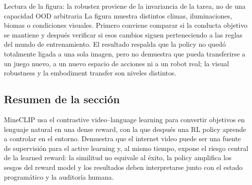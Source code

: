 
\begin{knowledgebox}{Lectura de la figura: la robustez proviene de la invariancia de la tarea, no de una capacidad OOD arbitraria}
La figura muestra distintos climas, iluminaciones, biomas o condiciones visuales. Primero conviene comparar si la conducta objetivo se mantiene y después verificar si esos cambios siguen perteneciendo a las reglas del mundo de entrenamiento. El resultado respalda que la policy no quedó totalmente ligada a una sola imagen, pero no demuestra que pueda transferirse a un juego nuevo, a un nuevo espacio de acciones ni a un robot real; la visual robustness y la embodiment transfer son niveles distintos.
\end{knowledgebox}


\subsection{Resumen de la sección}

MineCLIP usa el contrastive video--language learning para convertir objetivos en lenguaje natural en una dense reward, con la que después una RL policy aprende a controlar en el entorno. Demuestra que el internet video puede ser una fuente de supervisión para el active learning y, al mismo tiempo, expone el riesgo central de la learned reward: la similitud no equivale al éxito, la policy amplifica los sesgos del reward model y los resultados deben interpretarse junto con el estado programático y la auditoría humana.
